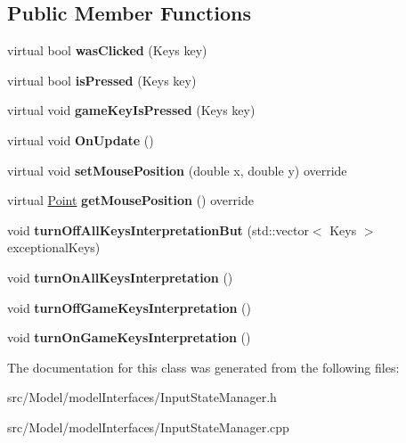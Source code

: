 \subsection*{Public Member Functions}
\begin{DoxyCompactItemize}
\item 
virtual bool {\bfseries was\+Clicked} (Keys key)\hypertarget{classInputStateManager_a80a571a44479945b573a395ed573d544}{}\label{classInputStateManager_a80a571a44479945b573a395ed573d544}

\item 
virtual bool {\bfseries is\+Pressed} (Keys key)\hypertarget{classInputStateManager_a72956a20fd290591649533fb675ab4fd}{}\label{classInputStateManager_a72956a20fd290591649533fb675ab4fd}

\item 
virtual void {\bfseries game\+Key\+Is\+Pressed} (Keys key)\hypertarget{classInputStateManager_ae3ec55da8d531326d3f8f5f87f590437}{}\label{classInputStateManager_ae3ec55da8d531326d3f8f5f87f590437}

\item 
virtual void {\bfseries On\+Update} ()\hypertarget{classInputStateManager_acca2485ba39be97b1389d1a8fd1ece7b}{}\label{classInputStateManager_acca2485ba39be97b1389d1a8fd1ece7b}

\item 
virtual void {\bfseries set\+Mouse\+Position} (double x, double y) override\hypertarget{classInputStateManager_ad898f90aadcb2cbe0244999b7d722eb1}{}\label{classInputStateManager_ad898f90aadcb2cbe0244999b7d722eb1}

\item 
virtual \hyperlink{classPoint}{Point} {\bfseries get\+Mouse\+Position} () override\hypertarget{classInputStateManager_a1accbbd8499059638da8f73befa6aa2b}{}\label{classInputStateManager_a1accbbd8499059638da8f73befa6aa2b}

\item 
void {\bfseries turn\+Off\+All\+Keys\+Interpretation\+But} (std\+::vector$<$ Keys $>$ exceptional\+Keys)\hypertarget{classInputStateManager_a1e9a22b3bd1d181c3adfe6c5aa968751}{}\label{classInputStateManager_a1e9a22b3bd1d181c3adfe6c5aa968751}

\item 
void {\bfseries turn\+On\+All\+Keys\+Interpretation} ()\hypertarget{classInputStateManager_a0459b2e5c04a69ade5ff623ad8bcc925}{}\label{classInputStateManager_a0459b2e5c04a69ade5ff623ad8bcc925}

\item 
void {\bfseries turn\+Off\+Game\+Keys\+Interpretation} ()\hypertarget{classInputStateManager_aaf74fd3bb50998eb66f28a6c3f6a825d}{}\label{classInputStateManager_aaf74fd3bb50998eb66f28a6c3f6a825d}

\item 
void {\bfseries turn\+On\+Game\+Keys\+Interpretation} ()\hypertarget{classInputStateManager_a0663f4374d397999ecc4f17f412c9e5c}{}\label{classInputStateManager_a0663f4374d397999ecc4f17f412c9e5c}

\end{DoxyCompactItemize}


The documentation for this class was generated from the following files\+:\begin{DoxyCompactItemize}
\item 
src/\+Model/model\+Interfaces/Input\+State\+Manager.\+h\item 
src/\+Model/model\+Interfaces/Input\+State\+Manager.\+cpp\end{DoxyCompactItemize}
